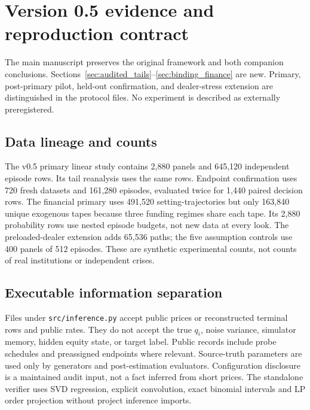 \documentclass[11pt,a4paper]{article}
\theoremstyle{definition}
\theoremstyle{remark}
\begin{document}
\section{Version 0.5 evidence and reproduction contract}
\label{app:v05_release}
The main manuscript preserves the original framework and both companion conclusions. Sections~\ref{sec:audited_tails}--\ref{sec:binding_finance} are new. Primary, post-primary pilot, held-out confirmation, and dealer-stress extension are distinguished in the protocol files. No experiment is described as externally preregistered.

\subsection{Data lineage and counts}
The v0.5 primary linear study contains 2,880 panels and 645,120 independent episode rows. Its tail reanalysis uses the same rows. Endpoint confirmation uses 720 fresh datasets and 161,280 episodes, evaluated twice for 1,440 paired decision rows. The financial primary uses 491,520 setting-trajectories but only 163,840 unique exogenous tapes because three funding regimes share each tape. Its 2,880 probability rows use nested episode budgets, not new data at every look. The preloaded-dealer extension adds 65,536 paths; the five assumption controls use 400 panels of 512 episodes. These are synthetic experimental counts, not counts of real institutions or independent crises.

\subsection{Executable information separation}
Files under \texttt{src/inference.py} accept public prices or reconstructed terminal rows and public rates. They do not accept the true $q_i$, noise variance, simulator memory, hidden equity state, or target label. Public records include probe schedules and preassigned endpoints where relevant. Source-truth parameters are used only by generators and post-estimation evaluators. Configuration disclosure is a maintained audit input, not a fact inferred from short prices. The standalone verifier uses SVD regression, explicit convolution, exact binomial intervals and LP order projection without project inference imports.
\end{document}
